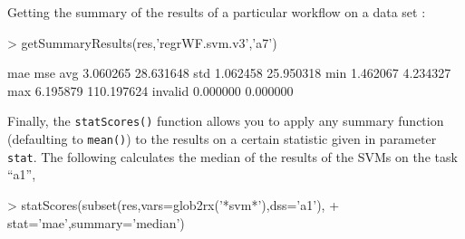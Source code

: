\documentclass[10pt,a4paper]{article}
\begin{document}
Getting the summary of the results of a particular workflow on a  data set :

\begin{Schunk}
\begin{Sinput}
> getSummaryResults(res,'regrWF.svm.v3','a7')
\end{Sinput}
\begin{Soutput}
             mae        mse
avg     3.060265  28.631648
std     1.062458  25.950318
min     1.462067   4.234327
max     6.195879 110.197624
invalid 0.000000   0.000000
\end{Soutput}
\end{Schunk}

Finally, the \texttt{statScores()} function allows you to apply any
summary function (defaulting to \texttt{mean()}) to the results on a
certain statistic given in parameter \texttt{stat}. The following
calculates the median of the results of the SVMs on the task ``a1'',

\begin{Schunk}
\begin{Sinput}
> statScores(subset(res,vars=glob2rx('*svm*'),dss='a1'),
+            stat='mae',summary='median')
\end{Sinput}
\end{Schunk}



\end{document}
